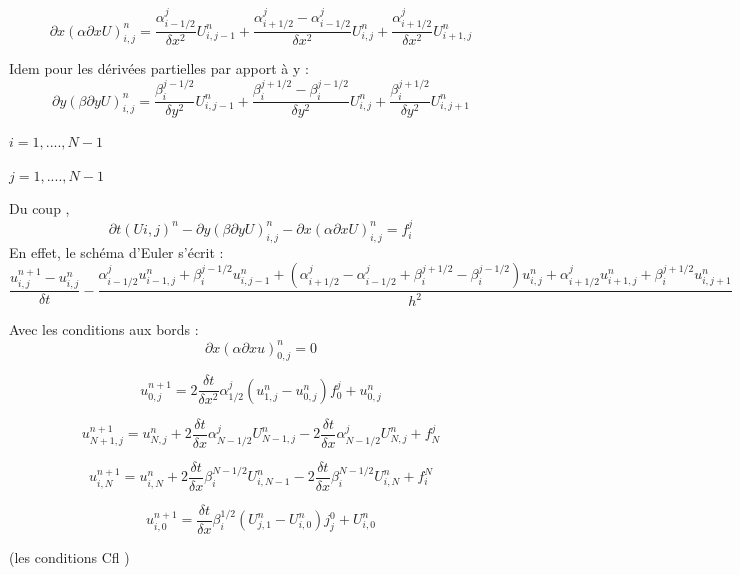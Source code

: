\documentclass[a4paper,12pt,twoside]{report}
\begin{document}
\begin{equation}
\partial{x}(\alpha \partial{x}U)_{i,j}^n=\frac{\alpha_{i-1/2}^j}{\delta x^2}U_{i,j-1}^n+\frac{\alpha_{i+1/2}^j-\alpha_{i-1/2}^j}{\delta x^2}U_{i,j}^n +\frac{\alpha_{i+1/2}^j}{\delta x^2}U_{i+1,j}^n
\end{equation}


 Idem pour les dérivées partielles par apport à y :
\begin{equation}
\partial{y}(\beta \partial{y}U)_{i,j}^n=\frac{\beta_i^{j-1/2}}{\delta y^2}U_{i,j-1}^n+\frac{\beta_{i}^{j+1/2}-\beta_{i}^{j-1/2}}{\delta y^2}U_{i,j}^n +\frac{\beta_{i}^{j+1/2}}{\delta y^2}U_{i,j+1}^n
\end{equation}


$i=1,....,N-1$

$j=1,....,N-1$

Du coup ,
\begin{equation}
\partial{t} (U{i,j} )^n -\partial{y}(\beta \partial{y}U)_{i,j}^n-\partial{x}(\alpha \partial{x}U)_{i,j}^n=f_i^j
\end{equation}
En effet, le schéma d'Euler s'écrit :
\begin{equation}
\frac{u_{i,j}^{n+1}-u_{i,j}^n}{\delta t}-\frac{\alpha_{i-1/2}^j  u_{i-1,j}^n +\beta_{i}^{j-1/2} u_{i,j-1}^{n}+ (\alpha_{i+1/2}^j - \alpha_{i-1/2}^j+ \beta_{i}^{j+1/2} -\beta_{i}^{j-1/2} ) u_{i,j}^n + \alpha_{i+1/2}^j u_{i+1,j}^{n} + \beta_{i}^{j+1/2} u_{i,j+1}^n}{h^2}
\end{equation}

Avec les conditions aux bords :
\begin{equation}
\partial{x}(\alpha\partial{x}u)_{0,j}^n=0
\end{equation}

\begin{equation}
u_{0,j}^{n+1}=2\frac{\delta t}{\delta x^2}\alpha_{1/2}^j(u_{1,j}^n-u_{0,j}^n)f_0^j +u_{0,j}^n
\end{equation}

\begin{equation}
u_{N+1,j}^{n+1}=u_{N,j}^{n}+2\frac{\delta t}{\delta x} \alpha_{N-1/2}^j U_{N-1,j}^n-2\frac{\delta t}{\delta x} \alpha_{N-1/2}^j U_{N,j}^n +f_N^j
\end{equation}

\begin{equation}
u_{i,N}^{n+1}=u_{i,N}^{n}+2\frac{\delta t}{\delta x} \beta_{i}^{N-1/2} U_{i,N-1}^n-2\frac{\delta t}{\delta x} \beta_{i}^{N-1/2} U_{i,N}^n +f_i^N
\end{equation}

\begin{equation}
u_{i,0}^{n+1}=\frac{\delta t}{\delta x} \beta_{i}^{1/2}(U_{j,1}^n-U_{i,0}^n)j_j^0+U_{i,0}^n
\end{equation}

(les conditions Cfl )
\end{document}
